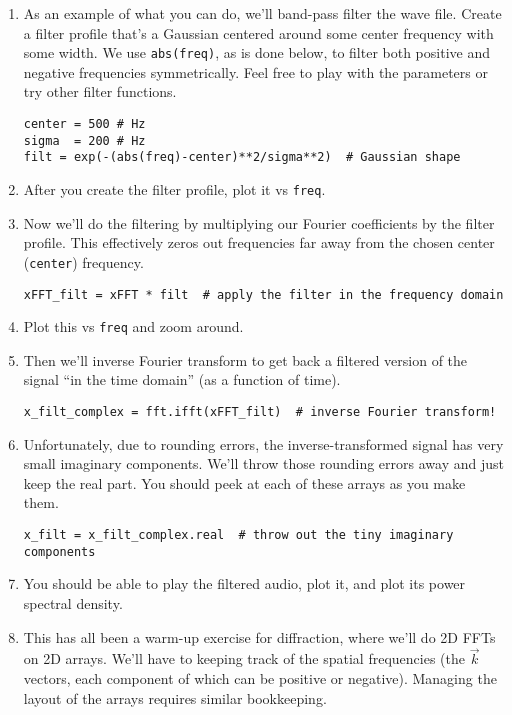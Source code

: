 \documentclass[11pt]{hmcpset}
\begin{document}
\begin{problem}
	\begin{enumerate}
		\item As an example of what you can do, we'll band-pass filter the wave file. Create a filter profile that's a Gaussian centered around some center frequency with some width. We use \texttt{abs(freq)}, as is done below, to filter both positive and negative frequencies symmetrically. Feel free to play with the parameters or try other filter functions. 
\begin{lstlisting}[style=Python]
center = 500 # Hz
sigma  = 200 # Hz
filt = exp(-(abs(freq)-center)**2/sigma**2)  # Gaussian shape
\end{lstlisting}
	    \item After you create the filter profile, plot it vs \texttt{freq}.
		\item Now we'll do the filtering by multiplying our Fourier coefficients by the filter profile. This effectively zeros out frequencies far away from the chosen center (\texttt{center}) frequency.
\begin{lstlisting}[style=Python]
xFFT_filt = xFFT * filt  # apply the filter in the frequency domain
\end{lstlisting}
	\item Plot this vs \texttt{freq} and zoom around.
	\item Then we'll inverse Fourier transform to get back a filtered version of the signal ``in the time domain'' (as a function of time). 
\begin{lstlisting}[style=Python]
x_filt_complex = fft.ifft(xFFT_filt)  # inverse Fourier transform!
\end{lstlisting}
	\item Unfortunately, due to rounding errors, the inverse-transformed signal has very small imaginary components. We'll throw those rounding errors away and just keep the real part. You should peek at each of these arrays as you make them.
\begin{lstlisting}[style=Python]
x_filt = x_filt_complex.real  # throw out the tiny imaginary components
\end{lstlisting}
	\item You should be able to play the filtered audio, plot it, and plot its power spectral density.
	\item This has all been a warm-up exercise for diffraction, where we'll do 2D FFTs on 2D arrays. We'll have to keeping track of the spatial frequencies (the $\vec k$ vectors, each component of which can be positive or negative). Managing the layout of the arrays requires similar bookkeeping.
\end{enumerate}
\end{problem}
\begin{solution}
	\vfill
\end{solution}
\pagebreak
\end{document}
